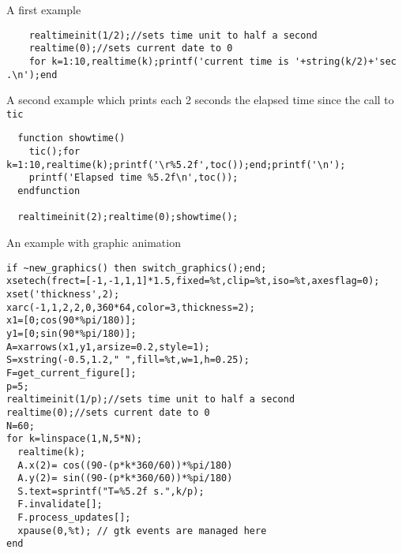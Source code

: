 \begin{examples}

\noindent A first example
  \begin{Verbatim}
    realtimeinit(1/2);//sets time unit to half a second
    realtime(0);//sets current date to 0
    for k=1:10,realtime(k);printf('current time is '+string(k/2)+'sec .\n');end
  \end{Verbatim}

\noindent A second example which prints each 2 seconds the elapsed time since
the call to \verb!tic!
\begin{Verbatim}
  function showtime()
    tic();for k=1:10,realtime(k);printf('\r%5.2f',toc());end;printf('\n');
    printf('Elapsed time %5.2f\n',toc());
  endfunction

  realtimeinit(2);realtime(0);showtime();
\end{Verbatim}

\noindent An example with graphic animation 

\begin{Verbatim}
if ~new_graphics() then switch_graphics();end;
xsetech(frect=[-1,-1,1,1]*1.5,fixed=%t,clip=%t,iso=%t,axesflag=0); 
xset('thickness',2);
xarc(-1,1,2,2,0,360*64,color=3,thickness=2); 
x1=[0;cos(90*%pi/180)];
y1=[0;sin(90*%pi/180)];
A=xarrows(x1,y1,arsize=0.2,style=1);
S=xstring(-0.5,1.2," ",fill=%t,w=1,h=0.25);
F=get_current_figure[];
p=5;
realtimeinit(1/p);//sets time unit to half a second
realtime(0);//sets current date to 0 
N=60;
for k=linspace(1,N,5*N);
  realtime(k);
  A.x(2)= cos((90-(p*k*360/60))*%pi/180)
  A.y(2)= sin((90-(p*k*360/60))*%pi/180)
  S.text=sprintf("T=%5.2f s.",k/p);
  F.invalidate[];
  F.process_updates[];
  xpause(0,%t); // gtk events are managed here
end
\end{Verbatim}

\end{examples}

